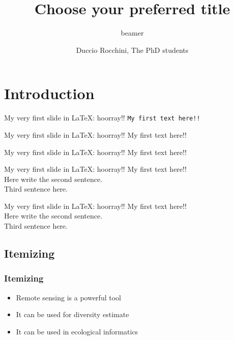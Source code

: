 \documentclass{beamer}
\title{Choose your preferred title}
\subtitle{beamer}
\author{Duccio Rocchini, The PhD students}
\institute{
 Alma Mater Studiorum UniBO\\
 \bigskip
 \texttt{[image: satellite2.jpeg]}
 }
\begin{document}
\maketitle


\section{Introduction}

\begin{frame}{My very first slide in LaTeX: hoorray!!}
    \texttt{My first text here!!}
\end{frame}

\begin{frame}{My very first slide in LaTeX: hoorray!!}
    \scriptsize{My first text here!!}
\end{frame}

\begin{frame}{My very first slide in LaTeX: hoorray!!}
    \tiny{My first text here!!}
\end{frame}



\begin{frame}{My very first slide in LaTeX: hoorray!!}
    My first text here!! \\
    Here write the second sentence. \\
    Third sentence here.
\end{frame}


\begin{frame}{My very first slide in LaTeX: hoorray!!}
    My first text here!! \\
    \bigskip
    Here write the second sentence. \\
    \bigskip
    Third sentence here.
\end{frame}

\subsection{Itemizing}

\begin{frame}
 \frametitle{Itemizing}
 \begin{itemize}
  \item Remote sensing is a powerful tool
  \item It can be used for diversity estimate
  \item It can be used in ecological informatics
 \end{itemize}
\end{frame}
\end{document}
